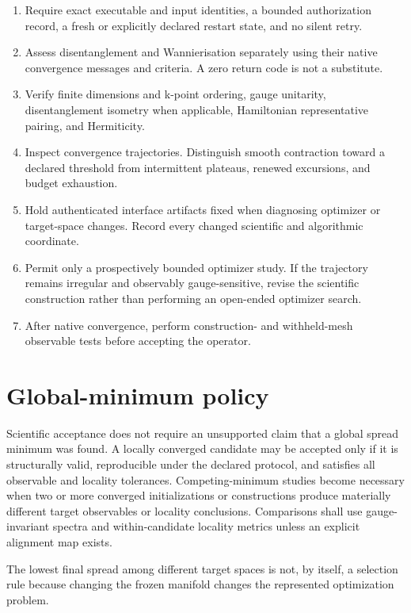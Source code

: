 \documentclass[11pt]{article}
\begin{document}
\begin{enumerate}
  \item Require exact executable and input identities, a bounded authorization record,
    a fresh or explicitly declared restart state, and no silent retry.
  \item Assess disentanglement and Wannierisation separately using their native
    convergence messages and criteria.  A zero return code is not a substitute.
  \item Verify finite dimensions and k-point ordering, gauge unitarity,
    disentanglement isometry when applicable, Hamiltonian representative pairing, and
    Hermiticity.
  \item Inspect convergence trajectories.  Distinguish smooth contraction toward a
    declared threshold from intermittent plateaus, renewed excursions, and budget
    exhaustion.
  \item Hold authenticated interface artifacts fixed when diagnosing optimizer or
    target-space changes.  Record every changed scientific and algorithmic coordinate.
  \item Permit only a prospectively bounded optimizer study.  If the trajectory remains
    irregular and observably gauge-sensitive, revise the scientific construction rather
    than performing an open-ended optimizer search.
  \item After native convergence, perform construction- and withheld-mesh observable
    tests before accepting the operator.
\end{enumerate}

\section{Global-minimum policy}

Scientific acceptance does not require an unsupported claim that a global spread
minimum was found.  A locally converged candidate may be accepted only if it is
structurally valid, reproducible under the declared protocol, and satisfies all
observable and locality tolerances.  Competing-minimum studies become necessary when two
or more converged initializations or constructions produce materially different target
observables or locality conclusions.  Comparisons shall use gauge-invariant spectra and
within-candidate locality metrics unless an explicit alignment map exists.

The lowest final spread among different target spaces is not, by itself, a selection
rule because changing the frozen manifold changes the represented optimization problem.
\end{document}
